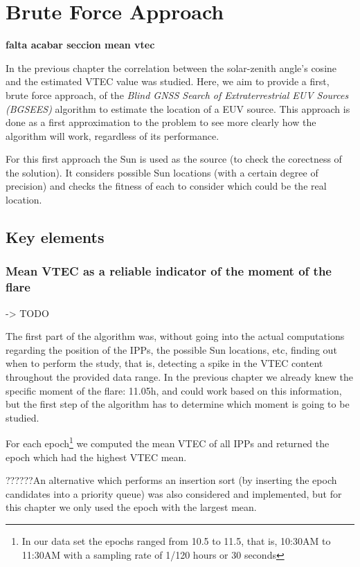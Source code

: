 \chapter{Brute Force Approach}

\textbf{falta acabar seccion mean vtec}

In the previous chapter the correlation between the solar-zenith angle's cosine and the estimated VTEC value was studied. Here, we aim to provide a first, brute force approach, of the \textit{Blind GNSS Search of Extraterrestrial EUV Sources (BGSEES)} algorithm to estimate the location of a EUV source. This approach is done as a first approximation to the problem to see more clearly how the algorithm will work, regardless of its performance.

For this first approach the Sun is used as the source (to check the corectness of the solution). It considers possible Sun locations (with a certain degree of precision) and checks the fitness of each to consider which could be the real location.

\section{Key elements}

\subsection{Mean VTEC as a reliable indicator of the moment of the flare} -> TODO

The first part of the algorithm was, without going into the actual computations regarding the position of the IPPs, the possible Sun locations, etc, finding out when to perform the study, that is, detecting a spike in the VTEC content throughout the provided data range. 
In the previous chapter we already knew the specific moment of the flare: 11.05h, and could work based on this information, but the first step of the algorithm has to determine which moment is going to be studied.

For each epoch\footnote{In our data set the epochs ranged from 10.5 to 11.5, that is, 10:30AM to 11:30AM with a sampling rate of 1/120 hours or 30 seconds} we computed the mean VTEC of all IPPs and returned the epoch which had the highest VTEC mean.

??????An alternative which performs an insertion sort (by inserting the epoch candidates into a priority queue) was also considered and implemented, but for this chapter we only used the epoch with the largest mean.

